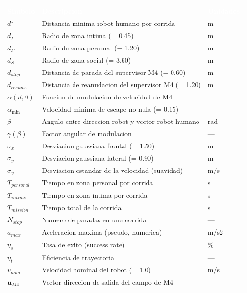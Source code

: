 \documentclass[12pt,a4paper,oneside]{book}
\begin{document}
\begin{table}[H]
\centering
\renewcommand{\arraystretch}{1.4}
\small
\begin{tabular}{lll}
\toprule
\rowcolor{primary}
\textcolor{white}{\textbf{Simbolo}} &
\textcolor{white}{\textbf{Descripcion}} &
\textcolor{white}{\textbf{Unidades}} \\
\midrule
$d^\star$        & Distancia minima robot-humano por corrida & m \\
$d_I$            & Radio de zona intima (= 0.45) & m \\
$d_P$            & Radio de zona personal (= 1.20) & m \\
$d_S$            & Radio de zona social (= 3.60) & m \\
$d_{stop}$       & Distancia de parada del supervisor M4 (= 0.60) & m \\
$d_{resume}$     & Distancia de reanudacion del supervisor M4 (= 1.20) & m \\
$\alpha(d,\beta)$ & Funcion de modulacion de velocidad de M4 & --- \\
$\alpha_{\min}$  & Velocidad minima de escape no nula (= 0.15) & --- \\
$\beta$          & Angulo entre direccion robot y vector robot-humano & rad \\
$\gamma(\beta)$  & Factor angular de modulacion & --- \\
$\sigma_x$       & Desviacion gaussiana frontal (= 1.50) & m \\
$\sigma_y$       & Desviacion gaussiana lateral (= 0.90) & m \\
$\sigma_v$       & Desviacion estandar de la velocidad (suavidad) & m/s \\
$T_{personal}$   & Tiempo en zona personal por corrida & s \\
$T_{intima}$     & Tiempo en zona intima por corrida & s \\
$T_{mission}$    & Tiempo total de la corrida & s \\
$N_{stop}$       & Numero de paradas en una corrida & --- \\
$a_{max}$        & Aceleracion maxima (pseudo, numerica) & m/s2 \\
$\eta_s$         & Tasa de exito (success rate) & \% \\
$\eta_t$         & Eficiencia de trayectoria & --- \\
$v_{nom}$        & Velocidad nominal del robot (= 1.0) & m/s \\
$\mathbf{u}_{M4}$ & Vector direccion de salida del campo de M4 & --- \\

\end{tabular}
\end{table}
\end{document}
